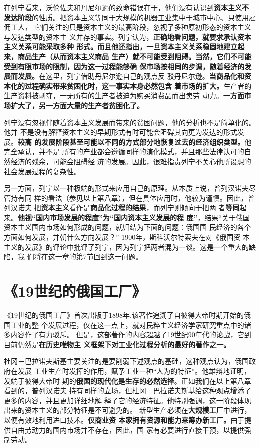 在列宁看来，沃伦佐夫和丹尼尔逊的致命错误在于，他们没有认识到\textbf{资本主义不
  发达阶段}的性质。把资本主义等同于大规模的机器工业集中于城市中心、只使用雇佣工人，
它们关注的只是资本主义的最高阶段，忽视了多种原初形态的资本主义与发达类型的资本主
义并存的事实。列宁认为，\textbf{正确地看问题，就要求承认资本主义关系可能采取多种
  形式。而且他还指出，一旦资本主义关系稳固地建立起来，商品生产（从而资本主义商品
  生产）就不可能受到阻碍。当然，它们不可能受到有限市场的限制，因为这一过程能够确
  保市场按相同的步调，随着经济的发展而发展。}在这里，列宁借助丹尼尔逊自己的观点反
驳丹尼尔逊。\textbf{当商品化和资本化的过程确实带来贫困化时，这一事实本身必然包含
  着市场的扩大。}生产者的生产资料被剥夺，一无所有的生产者被迫为购买消费品而出卖劳
动力。\textbf{一方面市场扩大了，另一方面大量的生产者贫困化了。}

列宁没有忽视伴随着资本主义发展而带来的贫困问题，他的分析也不是简单化的。他并
不是没有解释资本主义的早期形式有时可能会阻碍其向更为发达的形式发展。\textbf{较高
  的发展阶段甚至可能以不同的方式部分地恢复过去的经济组织类型。}他完全承认，并不是
所有的产业都会遵循同样的演化模式，并且那些法律认可的自然经济的残余，可能会阻碍经
济的发展。因此，很难指责列宁不关心他所设想的社会发展过程的复杂性。

另一方面，列宁以一种极端的形式来应用自己的原理。从本质上说，普列汉诺夫尽管持有同
样的看法（参见以上第八章），但在具体应用时，他较为谨慎。因此，普列汉诺夫
把\textbf{资本主义}看作是\textbf{商品化过程的结果}，而列宁则倾向于把两
者\textbf{等同}起来。\textbf{他视“国内市场发展的程度”为“国内资本主义发展的程
  度”}，结果“关于俄国资本主义国内市场如何形成的问题，就归结为下面的问题：俄国国
民经济的各个方面如何发展，并朝什么方向发展？” 1900年，斯科沃尔特索夫在对《俄国资
本主义的发展》的评论中批评了列宁，因为列宁把两者混为一谈。这是一个重大的缺陷，我
们将在这一章的第7节回到这一问题。

\section{《19世纪的俄国工厂》}
《19世纪的俄国工厂》首次出版于1898年,该著作追溯了自彼得大帝时期开始的俄国工业的整
个发展过程，仅在这一点上，就对民粹主义经济学家研究重点中的诸多内容作了有力驳斥。
但是，这部著作的内容超越了19世纪90年代的论战，它到目前仍然是\textbf{在历史唯物主
  义框架下对工业化过程分析的最好的著作之一。}

杜冈－巴拉诺夫斯基主要关注的是要削弱下述观点的基础，这种观点认为，俄国政府在发展
工业生产时发挥的作用，赋予工业一种“人为的特征”。他雄辩地证明，发端于彼得大帝时
期的\textbf{俄国的现代化是生存的必然选择}。正如我们在以上第八章看到的，普列汉诺夫
持有同样的立场，但杜冈－巴拉诺夫斯基给这种观点增添了更多的内容，并且更加详细地解
释了它的经济特征。他特别强调，这一阶段体现出来的资本主义的部分特征是不可避免的。
新型生产必须在\textbf{大规模工厂}中进行，以便有效地利用进口技术。\textbf{仅商业资
  本家拥有资源和能力来筹办新工厂。}由于提供自由劳动力的国内市场并不存在，因此，国
家有必要进行直接干预，以提供强制劳动。

